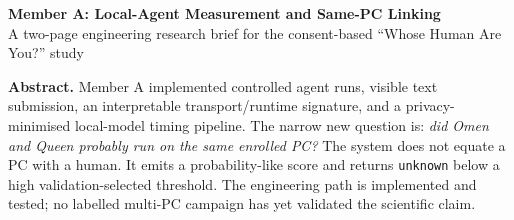 \documentclass{article}
\newcommand{\term}[1]{\texttt{#1}}
\begin{document}
\fontsize{8}{9.15}\selectfont
\begin{center}
{\LARGE\bfseries\color{navy} Member A: Local-Agent Measurement and Same-PC Linking}\\[-1pt]
{\small A two-page engineering research brief for the consent-based ``Whose Human Are You?'' study}
\end{center}

\vspace{-2mm}
\colorbox{pale}{\parbox{0.965\linewidth}{\textbf{Abstract.}
Member A implemented controlled agent runs, visible text submission, an interpretable transport/runtime signature,
and a privacy-minimised local-model timing pipeline. The narrow new question is: \emph{did Omen and Queen probably
run on the same enrolled PC?} The system does not equate a PC with a human. It emits a probability-like score and
returns \term{unknown} below a high validation-selected threshold. The engineering path is implemented and tested;
no labelled multi-PC campaign has yet validated the scientific claim.}}
\end{document}
